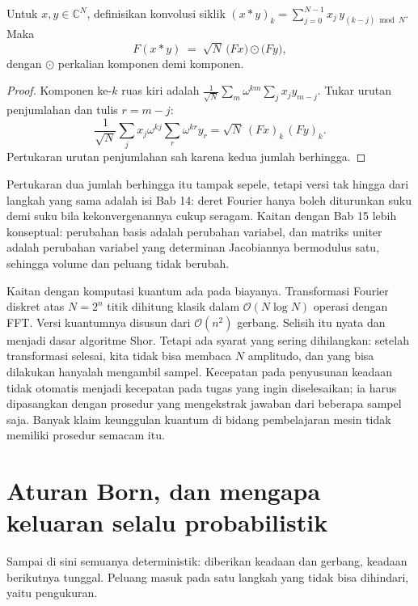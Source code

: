 \begin{teorema}
Untuk $x,y\in\mathbb{C}^{N}$, definisikan konvolusi siklik
$(x*y)_k=\sum_{j=0}^{N-1}x_j\,y_{(k-j)\bmod N}$. Maka
\begin{equation}
F(x*y) \;=\; \sqrt{N}\,\bigl(Fx\bigr)\odot\bigl(Fy\bigr),
\end{equation}
dengan $\odot$ perkalian komponen demi komponen.
\end{teorema}

\begin{proof}
Komponen ke-$k$ ruas kiri adalah $\frac{1}{\sqrt{N}}\sum_m\omega^{km}\sum_j x_j
y_{m-j}$. Tukar urutan penjumlahan dan tulis $r=m-j$:
\[
\frac{1}{\sqrt{N}}\sum_j x_j\omega^{kj}\sum_r\omega^{kr}y_r
=\sqrt{N}\,(Fx)_k\,(Fy)_k .
\]
Pertukaran urutan penjumlahan sah karena kedua jumlah berhingga.
\end{proof}

Pertukaran dua jumlah berhingga itu tampak sepele, tetapi versi tak hingga dari langkah
yang sama adalah isi Bab 14: deret Fourier hanya boleh diturunkan suku demi suku bila
kekonvergenannya cukup seragam. Kaitan dengan Bab 15 lebih konseptual: perubahan basis
adalah perubahan variabel, dan matriks uniter adalah perubahan variabel yang determinan
Jacobiannya bermodulus satu, sehingga volume dan peluang tidak berubah.

Kaitan dengan komputasi kuantum ada pada biayanya. Transformasi Fourier diskret atas
$N=2^{n}$ titik dihitung klasik dalam $\mathcal{O}(N\log N)$ operasi dengan FFT.
Versi kuantumnya disusun dari $\mathcal{O}(n^{2})$ gerbang. Selisih itu nyata dan
menjadi dasar algoritme Shor. Tetapi ada syarat yang sering dihilangkan: setelah
transformasi selesai, kita tidak bisa membaca $N$ amplitudo, dan yang bisa dilakukan
hanyalah mengambil sampel. Kecepatan pada penyusunan keadaan tidak otomatis menjadi
kecepatan pada tugas yang ingin diselesaikan; ia harus dipasangkan dengan prosedur yang
mengekstrak jawaban dari beberapa sampel saja. Banyak klaim keunggulan kuantum di bidang
pembelajaran mesin tidak memiliki prosedur semacam itu.

\section{Aturan Born, dan mengapa keluaran selalu probabilistik}

Sampai di sini semuanya deterministik: diberikan keadaan dan gerbang, keadaan
berikutnya tunggal. Peluang masuk pada satu langkah yang tidak bisa dihindari, yaitu
pengukuran.

